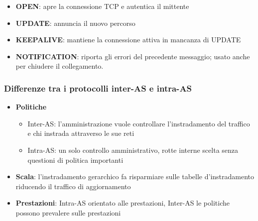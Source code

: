 \documentclass[
]{article}
\begin{document}
\begin{itemize}
\item
  \textbf{OPEN}: apre la connessione TCP e autentica il mittente
\item
  \textbf{UPDATE}: annuncia il nuovo percorso
\item
  \textbf{KEEPALIVE}: mantiene la connessione attiva in mancanza di
  UPDATE
\item
  \textbf{NOTIFICATION}: riporta gli errori del precedente messaggio;
  usato anche per chiudere il collegamento.
\end{itemize}

\hypertarget{header-n349}{%
\subsubsection{Differenze tra i protocolli inter-AS e
intra-AS}\label{header-n349}}

\begin{itemize}
\item
  \textbf{Politiche}

  \begin{itemize}
  \item
    Inter-AS: l'amministrazione vuole controllare l'instradamento del
    traffico e chi instrada attraverso le sue reti
  \item
    Intra-AS: un solo controllo amministrativo, rotte interne scelta
    senza questioni di politica importanti
  \end{itemize}
\item
  \textbf{Scala}: l'instradamento gerarchico fa risparmiare sulle
  tabelle d'instradamento riducendo il traffico di aggiornamento
\item
  \textbf{Prestazioni}: Intra-AS orientato alle prestazioni, Inter-AS le
  politiche possono prevalere sulle prestazioni
\end{itemize}
\end{document}
